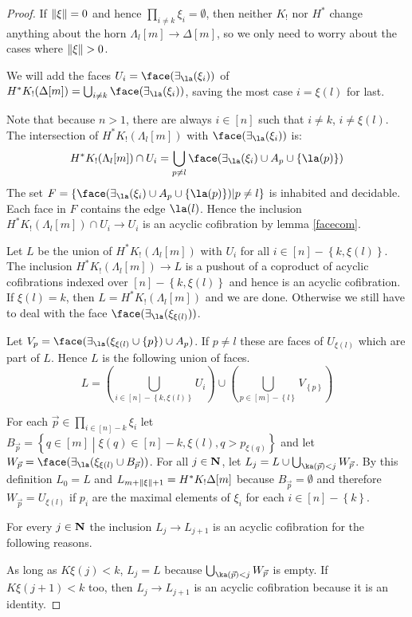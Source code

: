 \documentclass{amsart}
\theoremstyle{plain}
\theoremstyle{definition}
\newcommand\set[1]{\left\{#1\right\}}
\newcommand\ri{^*}
\begin{document}
\begin{proof} If $\left\Vert\xi\right\Vert=0$ and hence $\prod_{i\neq k}\xi_i=\emptyset$, then neither $K_!$ nor $H^*$ change anything about the horn $\Lambda_l[m]\to\Delta[m]$, so we only need to worry about the cases where $\left\Vert\xi\right\Vert>0$.

We will add the faces $U_i = \face(\im\la(\xi_i))$ of $H\ri K_!(\Delta[m]) = \bigcup_{i\neq k} \face(\im\la(\xi_i))$, saving the most case $i=\xi(l)$ for last.

Note that because $n>1$, there are always $i\in [n]$ such that $i\neq k$, $i\neq \xi(l)$. The intersection of $H\ri K_!(\Lambda_l[m])$ with $\face(\im\la(\xi_i))$ is:
\[ H\ri K_!(\Lambda_l[m])\cap U_i = \bigcup_{p\neq l} \face(\im\la(\xi_i)\cup A_p\cup\set{\la(p)})\]
The set $F = \set{\face(\im\la(\xi_i)\cup A_p\cup\set{\la(p)})|p\neq l}$ is inhabited and decidable. Each face in $F$ contains the edge $\la(l)$. Hence the inclusion $H\ri K_!(\Lambda_l[m])\cap U_i\to U_i$ is an acyclic cofibration by lemma \ref{facecom}.

Let $L$ be the union of $H\ri K_!(\Lambda_l[m])$ with $U_i$ for all $i\in [n] -\set{k, \xi(l)}$. The inclusion $H\ri K_!(\Lambda_l[m])\to L$ is a pushout of a coproduct of acyclic cofibrations indexed over $[n]-\set{k,\xi(l)}$ and hence is an acyclic cofibration. If $\xi(l)=k$, then $L=H\ri K_!(\Lambda_l[m])$ and we are done. Otherwise we still have to deal with the face $\face(\im\la(\xi_{\xi(l)}))$.

Let $V_p =\face(\im\la(\xi_{\xi(l)}\cup\set p)\cup A_p)$. If $p\neq l$ these are faces of $U_{\xi(l)}$ which are part of $L$. Hence $L$ is the following union of faces.
\[ L = \left(\bigcup_{i\in[n]-\set{k,\xi(l)}} U_i\right)\cup\left(\bigcup_{p\in [m]-\set l} V_{\set p}\right) \] 

For each $\vec p\in \prod_{i\in [n]-{k}} \xi_i$ let $B_{\vec p} = \set{q\in [m]\middle | \xi(q)\in [n]-{k,\xi(l)} , q>p_{\xi(q)} }$ and let $W_{\vec p} = \face(\im\la(\xi_{\xi(l)}\cup B_{\vec p}))$. For all $j\in\mathbf N$, let $L_{j} = L\cup \bigcup_{ \ka(\vec p) < j } W_{\vec p}$. By this definition $L_0=L$ and $L_{m+\left\Vert\xi\right\Vert+1} = H^*K_!\Delta[m]$ because $B_{\vec p}=\emptyset$ and therefore $W_{\vec p} = U_{\xi(l)}$ if $p_i$ are the maximal elements of $\xi_i$ for each $i\in [n]-\set k$. 

For every $j\in \mathbf N$ the inclusion $L_j\to L_{j+1}$ is an acyclic cofibration for the following reasons.

As long as $K\xi(j)<k$, $L_j = L$ because $\bigcup_{ \ka(\vec p) < j } W_{\vec p}$ is empty. If $K\xi(j+1)<k$ too, then $L_j\to L_{j+1}$ is an acyclic cofibration because it is an identity.


\end{proof}
\end{document}
